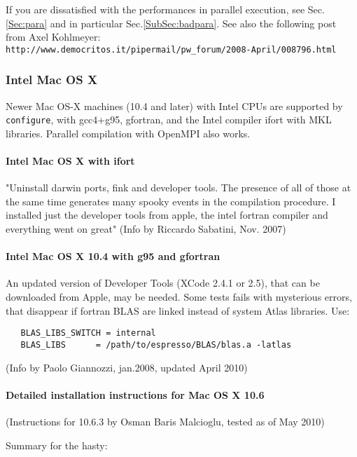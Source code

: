 \documentclass[12pt,a4paper]{article}
\def\configure{\texttt{configure}}
\begin{document}
If you are dissatisfied with the performances in parallel execution,
see Sec.\ref{Sec:para} and in particular Sec.\ref{SubSec:badpara}.
See also the following post from Axel Kohlmeyer:\\
\texttt{http://www.democritos.it/pipermail/pw\_forum/2008-April/008796.html}

\subsubsection{Intel Mac OS X}

Newer Mac OS-X machines (10.4 and later) with Intel CPUs are supported 
by \configure,
with gcc4+g95, gfortran, and the Intel compiler ifort with MKL libraries.
Parallel compilation with OpenMPI also works.

\paragraph{Intel Mac OS X with ifort}

"Uninstall darwin ports, fink and developer tools. The presence of all of
those at the same time generates many spooky events in the compilation
procedure.  I installed just the developer tools from apple, the intel
fortran compiler and everything went on great" (Info by Riccardo Sabatini, 
Nov. 2007)

\paragraph{Intel Mac OS X 10.4 with g95 and gfortran}

An updated version of Developer Tools (XCode 2.4.1 or 2.5), that can be 
downloaded from Apple, may be needed. Some tests fails with mysterious 
errors, that disappear if
fortran BLAS are linked instead of system Atlas libraries. Use: 
\begin{verbatim}
   BLAS_LIBS_SWITCH = internal
   BLAS_LIBS      = /path/to/espresso/BLAS/blas.a -latlas
\end{verbatim}
(Info by Paolo Giannozzi, jan.2008, updated April 2010)

\paragraph{Detailed installation instructions for Mac OS X 10.6}

(Instructions for 10.6.3 by Osman Baris Malcioglu, tested as of May 2010)

Summary for the hasty: 
\end{document}
